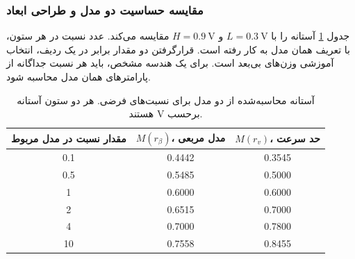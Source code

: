 \subsubsection{مقایسه حساسیت دو مدل و طراحی ابعاد}
\label{sec:beta-sensitivity-sizing}
جدول \ref{tab:beta-threshold-comparison} آستانه را با
\(L=\qty{0.3}{\volt}\) و \(H=\qty{0.9}{\volt}\) مقایسه می‌کند.
عدد نسبت در هر ستون، با تعریف همان مدل به کار رفته است.
قرارگرفتن دو مقدار برابر در یک ردیف، انتخاب آموزشی وزن‌های
بی‌بعد است. برای یک هندسه مشخص، باید هر نسبت جداگانه از
پارامترهای همان مدل محاسبه شود.
\begin{table}[!htbp]
\centering
\small
\caption{آستانه محاسبه‌شده از دو مدل برای نسبت‌های فرضی.
هر دو ستون آستانه برحسب \(\unit{\volt}\) هستند.}
\label{tab:beta-threshold-comparison}
\begin{tabular}{ccc}
\toprule
مقدار نسبت در مدل مربوط & \(M(r_\beta)\)، مدل مربعی & \(M(r_v)\)، حد سرعت\\
\midrule
\num{0.1} & \num{0.4442} & \num{0.3545}\\
\num{0.5} & \num{0.5485} & \num{0.5000}\\
\num{1} & \num{0.6000} & \num{0.6000}\\
\num{2} & \num{0.6515} & \num{0.7000}\\
\num{4} & \num{0.7000} & \num{0.7800}\\
\num{10} & \num{0.7558} & \num{0.8455}\\
\bottomrule
\end{tabular}
\end{table}

